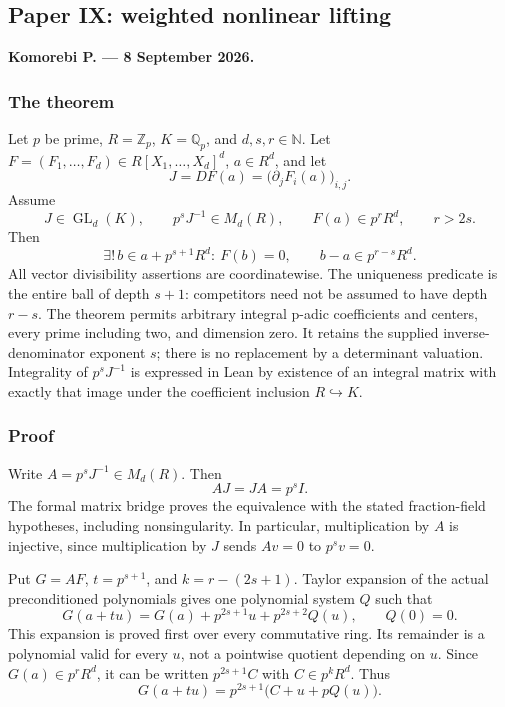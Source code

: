 \hypertarget{cont6:paper-ix-weighted-nonlinear-lifting}{%
\subsection{Paper IX: weighted nonlinear
lifting}\label{cont6:paper-ix-weighted-nonlinear-lifting}}

\textbf{Komorebi P. --- 8 September 2026.}

\hypertarget{cont6:the-theorem}{%
\subsubsection{The theorem}\label{cont6:the-theorem}}

Let \(p\) be prime, \(R=\mathbb Z_p\), \(K=\mathbb Q_p\), and
\(d,s,r\in\mathbb N\). Let
\(F=(F_1,\ldots,F_d)\in R[X_1,\ldots,X_d]^d\), \(a\in R^d\), and let \[
J=DF(a)=\bigl(\partial_jF_i(a)\bigr)_{i,j}.
\] Assume \[
J\in\operatorname{GL}_d(K),\qquad p^sJ^{-1}\in M_d(R),\qquad
F(a)\in p^rR^d,\qquad r>2s.
\] Then \[
\boxed{\exists!\,b\in a+p^{s+1}R^d:\ F(b)=0,}
\qquad
\boxed{b-a\in p^{r-s}R^d.}
\] All vector divisibility assertions are coordinatewise. The uniqueness
predicate is the entire ball of depth \(s+1\): competitors need not be
assumed to have depth \(r-s\). The theorem permits arbitrary integral
p-adic coefficients and centers, every prime including two, and
dimension zero. It retains the supplied inverse-denominator exponent
\(s\); there is no replacement by a determinant valuation. Integrality
of \(p^sJ^{-1}\) is expressed in Lean by existence of an integral matrix
with exactly that image under the coefficient inclusion
\(R\hookrightarrow K\).

\hypertarget{cont6:proof}{%
\subsubsection{Proof}\label{cont6:proof}}

Write \(A=p^sJ^{-1}\in M_d(R)\). Then \[
AJ=JA=p^sI.
\] The formal matrix bridge proves the equivalence with the stated
fraction-field hypotheses, including nonsingularity. In particular,
multiplication by \(A\) is injective, since multiplication by \(J\)
sends \(Av=0\) to \(p^sv=0\).

Put \(G=AF\), \(t=p^{s+1}\), and \(k=r-(2s+1)\). Taylor expansion of the
actual preconditioned polynomials gives one polynomial system \(Q\) such
that \[
G(a+tu)=G(a)+p^{2s+1}u+p^{2s+2}Q(u),\qquad Q(0)=0.
\] This expansion is proved first over every commutative ring. Its
remainder is a polynomial valid for every \(u\), not a pointwise
quotient depending on \(u\). Since \(G(a)\in p^rR^d\), it can be written
\(p^{2s+1}C\) with \(C\in p^kR^d\). Thus \[
G(a+tu)=p^{2s+1}\bigl(C+u+pQ(u)\bigr).
\]

